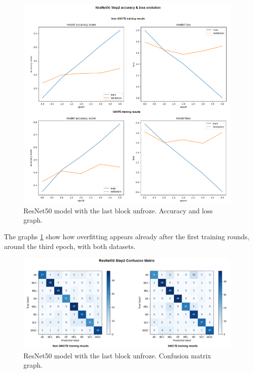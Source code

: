 \begin{figure}[ht]
    \begin{center}
        \includegraphics[scale=0.75]{images/Building/Model RestNet50/model_RNet_2_model accuray-loss.png}
        \caption{ResNet50 model with the last block unfroze. Accuracy and loss graph.}
    \label{fig: ResNet50_2_accuracy_loss}    
    \end{center}
\end{figure}

The graphs \ref{fig: ResNet50_2_accuracy_loss} show how overfitting appears already after the first training rounds, around the third epoch, with both datasets.

\begin{figure}[ht]
    \begin{center}
        \includegraphics[scale=0.60]{images/Building/Model RestNet50/model_RNet_2_confmat.png}
        \caption{ResNet50 model with the last block unfroze. Confusion matrix graph.}
    \label{fig: ResNet50_2_confmat}    
    \end{center}
\end{figure}


